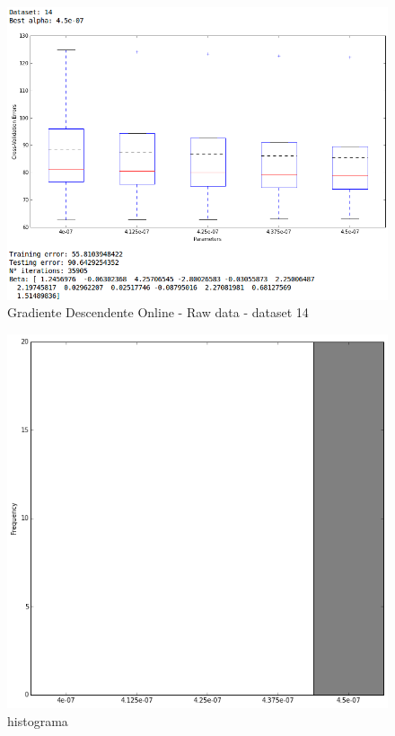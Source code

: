 \documentclass[spanish, fleqn]{article}
\begin{document}
\begin{enumerate}
\begin{figure}[!htpb]
\centering
 \includegraphics[scale=0.45]{gd_online_raw14.png}
 \caption{Gradiente Descendente Online - Raw data - dataset 14}
\end{figure}

\begin{figure}[!htpb]
\centering
 \includegraphics[scale=0.4]{hist_gd_online_raw.png}
 \caption{histograma}
\end{figure}


\end{enumerate}
\end{document}
